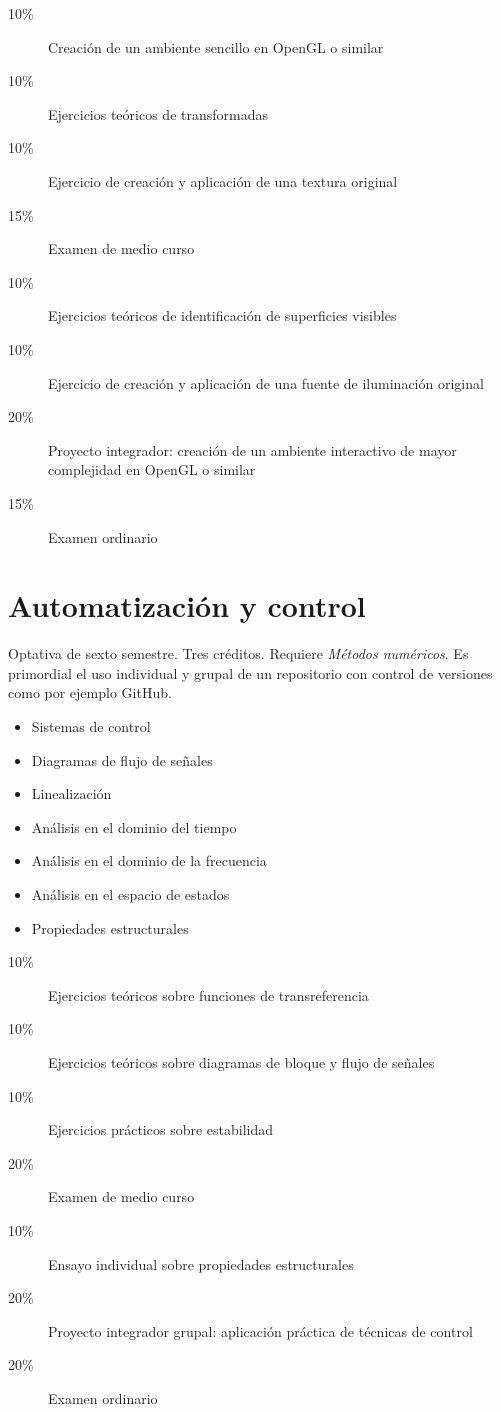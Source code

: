 \documentclass{article}
\begin{document}
\begin{multicols}{4}
\begin{description}
\item[10\%]{Creaci\'{o}n de un ambiente sencillo en OpenGL o similar}
\item[10\%]{Ejercicios te\'{o}ricos de transformadas}
\item[10\%]{Ejercicio de creaci\'{o}n y aplicaci\'{o}n de una textura original}
\item[15\%]{Examen de medio curso}  
\item[10\%]{Ejercicios te\'{o}ricos de identificaci\'{o}n de superficies visibles}
\item[10\%]{Ejercicio de creaci\'{o}n y aplicaci\'{o}n de una fuente de
  iluminaci\'{o}n original}
\item[20\%]{Proyecto integrador: creaci\'{o}n de un ambiente interactivo
  de mayor complejidad en OpenGL o similar}
\item[15\%]{Examen ordinario}
\end{description}  

\newpage

\hypertarget{ayc}{\section*{Automatizaci\'{o}n y control}} 

Optativa de sexto semestre. Tres cr\'{e}ditos. Requiere {\em
  M\'{e}todos num\'{e}ricos}. Es primordial el uso individual y grupal
de un repositorio con control de versiones como por ejemplo GitHub.

\begin{itemize}
\item{Sistemas de control}
\item{Diagramas de flujo de se\~{n}ales}
\item{Linealizaci\'{o}n}
\item{An\'{a}lisis en el dominio del tiempo}
\item{An\'{a}lisis en el dominio de la frecuencia}
\item{An\'{a}lisis en el espacio de estados}
\item{Propiedades estructurales}
\end{itemize}

\begin{description}
\item[10\%]{Ejercicios te\'{o}ricos sobre funciones de transreferencia}
\item[10\%]{Ejercicios te\'{o}ricos sobre diagramas de bloque y flujo de se\~{n}ales}
\item[10\%]{Ejercicios pr\'{a}cticos sobre estabilidad}
\item[20\%]{Examen de medio curso}
\item[10\%]{Ensayo individual sobre propiedades estructurales}
\item[20\%]{Proyecto integrador grupal: aplicaci\'{o}n pr\'{a}ctica de
  t\'{e}cnicas de control}
\item[20\%]{Examen ordinario}
\end{description}  


\end{multicols}
\end{document}

